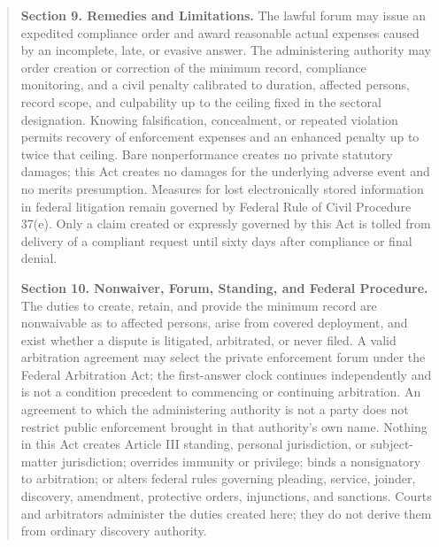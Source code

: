 \begin{quote}
\textbf{Section 9. Remedies and Limitations.} The lawful forum may issue an expedited compliance order and award reasonable actual expenses caused by an incomplete, late, or evasive answer. The administering authority may order creation or correction of the minimum record, compliance monitoring, and a civil penalty calibrated to duration, affected persons, record scope, and culpability up to the ceiling fixed in the sectoral designation. Knowing falsification, concealment, or repeated violation permits recovery of enforcement expenses and an enhanced penalty up to twice that ceiling. Bare nonperformance creates no private statutory damages; this Act creates no damages for the underlying adverse event and no merits presumption. Measures for lost electronically stored information in federal litigation remain governed by Federal Rule of Civil Procedure 37(e). Only a claim created or expressly governed by this Act is tolled from delivery of a compliant request until sixty days after compliance or final denial.

\textbf{Section 10. Nonwaiver, Forum, Standing, and Federal Procedure.} The duties to create, retain, and provide the minimum record are nonwaivable as to affected persons, arise from covered deployment, and exist whether a dispute is litigated, arbitrated, or never filed. A valid arbitration agreement may select the private enforcement forum under the Federal Arbitration Act; the first-answer clock continues independently and is not a condition precedent to commencing or continuing arbitration. An agreement to which the administering authority is not a party does not restrict public enforcement brought in that authority's own name. Nothing in this Act creates Article III standing, personal jurisdiction, or subject-matter jurisdiction; overrides immunity or privilege; binds a nonsignatory to arbitration; or alters federal rules governing pleading, service, joinder, discovery, amendment, protective orders, injunctions, and sanctions. Courts and arbitrators administer the duties created here; they do not derive them from ordinary discovery authority.


\end{quote}
